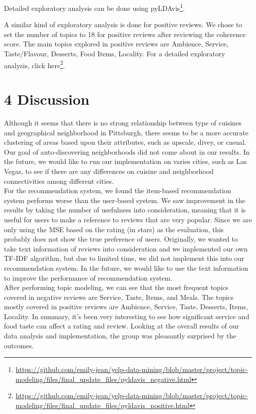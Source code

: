 \documentclass{neu_handout}
\begin{document}
Detailed exploratory analysis can be done using pyLDAvis\footnote{\url{https://github.com/emily-jean/yelp-data-mining/blob/master/project/topic-modeling/files/final_update_files/pyldavis_negative.html}}.

A similar kind of exploratory analysis is done for positive reviews. We chose to set the number of topics to 18 for positive reviews after reviewing the coherence score. The main topics explored in positive reviews are Ambience, Service, Taste/Flavour, Desserts, Food Items, Locality. For a detailed exploratory analysis, click here\footnote{\url{https://github.com/emily-jean/yelp-data-mining/blob/master/project/topic-modeling/files/final_update_files/pyldavis_positive.html}}.


\section*{4 Discussion}

Although it seems that there is no strong relationship between type of cuisines and geographical neighborhood in Pittsburgh, there seems to be a more accurate clustering of areas based upon their attributes, such as upscale, divey, or casual. Our goal of auto-discovering neighborhoods did not come about in our results. In the future, we would like to run our implementation on varies cities, such as Las Vegas, to see if there are any differences on
cuisine and neighborhood connectivities among different cities.\\

For the recommendation system, we found the item-based recommendation system performs worse than the user-based system. We saw improvement in the results by taking the number of usefulness into consideration, meaning that it is useful for users to make a reference to reviews that are very popular. Since we are only using the MSE based on the rating (in stars) as the evaluation, this probably does not show the true preference of users. Originally, we wanted to take text information of reviews into consideration and we implemented our own TF-IDF algorithm, but due to limited time, we did not implement this into our recommendation system. In the future, we would like to use the text information to improve the performance of recommendation system.\\

After performing topic modeling, we can see that the most frequent topics covered in negative reviews are Service, Taste, Items, and Meals. The topics mostly covered in positive reviews are Ambience, Service, Taste, Desserts, Items, Locality. In summary, it's been very interesting to see how significant service and food taste can affect a rating and review. Looking at the overall results of our data analysis and implementation, the group was pleasantly surprised by the
outcomes.\\
\end{document}
